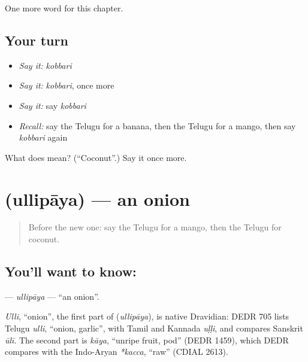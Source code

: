 \begin{grammarlens}[title={What you've built}]
One more word for this chapter.
\end{grammarlens}

\subsection*{Your turn}
\begin{itemize}
\raggedright
  \item \emph{Say it:} \emph{kobbari}
  \item \emph{Say it:} \emph{kobbari}, once more
  \item \emph{Say it:} say \emph{kobbari}
  \item \emph{Recall:} say the Telugu for a banana, then the Telugu for a mango, then say \emph{kobbari} again
\end{itemize}

\begin{tcolorbox}[breakable,colback=teal!4,colframe=teal!35!black,title={Before you move on}]
What does  mean? (\textquotedblleft{}Coconut\textquotedblright{}.) Say it once more.
\end{tcolorbox}
\section[\texorpdfstring{\te{ఉల్లిపాయ} (ullipāya)}{ఉల్లిపాయ (ullipāya)}]{ (ullipāya) — an onion}

\label{lesson:TE-C117-ullipaya}



\begin{quote}
Before the new one: say the Telugu for a mango, then the Telugu for coconut.
\end{quote}

\subsection*{You'll want to know: }
\textbf{} — \emph{ullipāya} — \textquotedblleft{}an onion\textquotedblright{}.

\begin{cousinweb}
\emph{Ulli}, \textquotedblleft{}onion\textquotedblright{}, the first part of \textbf{} (\emph{ullipāya}), is native Dravidian: DEDR 705 lists Telugu \emph{ulli}, \textquotedblleft{}onion, garlic\textquotedblright{}, with Tamil and Kannada \emph{uḷḷi}, and compares Sanskrit \emph{ūlī}. The second part is \emph{kāya}, \textquotedblleft{}unripe fruit, pod\textquotedblright{} (DEDR 1459), which DEDR compares with the Indo-Aryan \emph{*kacca}, \textquotedblleft{}raw\textquotedblright{} (CDIAL 2613).
\end{cousinweb}


